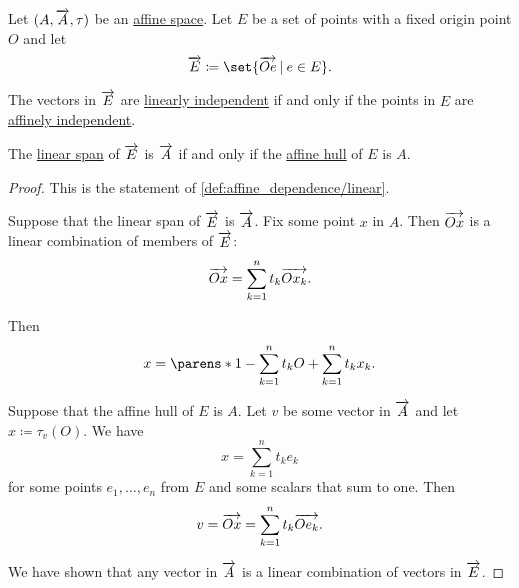 \begin{proposition}\label{thm:linear_and_affine_bases}
  Let \( (A, \overrightarrow{A}, \tau) \) be an \hyperref[def:affine_space]{affine space}. Let \( E \) be a set of points with a fixed origin point \( O \) and let
  \begin{equation*}
    \vect E \coloneqq \set{ \vect{Oe} \given e \in E }.
  \end{equation*}

  \begin{thmenum}
     The vectors in \( \overrightarrow{E} \) are \hyperref[def:linear_dependence]{linearly independent} if and only if the points in \( E \) are \hyperref[def:affine_dependence]{affinely independent}.

     The \hyperref[def:semimodule/submodel]{linear span} of \( \overrightarrow{E} \) is \( \overrightarrow{A} \) if and only if the \hyperref[def:affine_hull]{affine hull} of \( E \) is \( A \).
  \end{thmenum}
\end{proposition}
\begin{proof}
   This is the statement of \cref{def:affine_dependence/linear}.

  \SufficiencySubProof* Suppose that the linear span of \( \overrightarrow{E} \) is \( \overrightarrow{A} \). Fix some point \( x \) in \( A \). Then \( \overrightarrow{Ox} \) is a linear combination of members of \( \overrightarrow{E} \):
  \begin{equation*}
    \overrightarrow{Ox} = \sum_{k=1}^n t_k \overrightarrow{O x_k}.
  \end{equation*}

  Then
  \begin{equation*}
    x = \parens*{ 1 - \sum_{k=1}^n t_k } O + \sum_{k=1}^n t_k x_k.
  \end{equation*}

  \NecessitySubProof* Suppose that the affine hull of \( E \) is \( A \). Let \( v \) be some vector in \( \overrightarrow{A} \) and let \( x \coloneqq \tau_v(O) \). We have
  \begin{equation*}
    x = \sum_{k=1}^n t_k e_k
  \end{equation*}
  for some points \( e_1, \ldots, e_n \) from \( E \) and some scalars that sum to one. Then
  \begin{equation*}
    v = \overrightarrow{Ox} = \sum_{k=1}^n t_k \overrightarrow{O e_k}.
  \end{equation*}

  We have shown that any vector in \( \overrightarrow{A} \) is a linear combination of vectors in \( \overrightarrow{E} \).
\end{proof}

